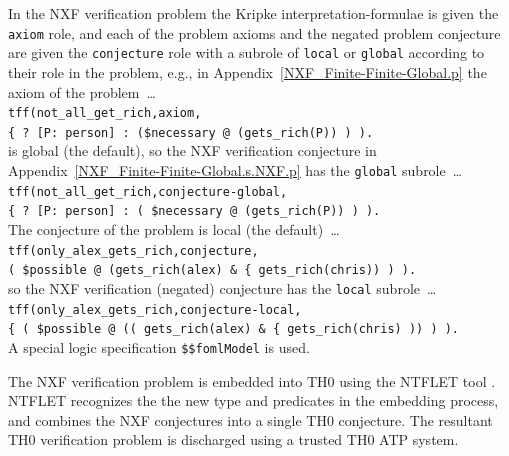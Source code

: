 \documentclass{easychair}
\newcommand{\smalltt}[1]{\small \texttt{#1}}
\begin{document}
In the NXF verification problem the Kripke interpretation-formulae is given the {\tt axiom} role,
and each of the problem axioms and the negated problem conjecture are given the {\tt conjecture} 
role with a subrole of {\tt local} or {\tt global} according to their role in the problem, e.g., 
in Appendix~\ref{NXF_Finite-Finite-Global.p} the axiom of the problem~\ldots \\
\hspace*{0.5cm}\smalltt{tff(not\_all\_get\_rich,axiom,} \\
\hspace*{0.8cm}\smalltt{\{{\raisebox{0.4ex}{\texttildelow}} ? [P: person] : ({\$necessary} @ (gets\_rich(P)) ) ).}\\
is global (the default), so the NXF verification conjecture in 
Appendix~\ref{NXF_Finite-Finite-Global.s.NXF.p} has the {\tt global} subrole~\ldots \\
\hspace*{0.5cm}\smalltt{tff(not\_all\_get\_rich,conjecture-global,} \\
\hspace*{0.8cm}\smalltt{\{{\raisebox{0.4ex}{\texttildelow}} ? [P: person] : ( {\$necessary} @ (gets\_rich(P)) ) ).} \\
The conjecture of the problem is local (the default)~\ldots \\
\hspace*{0.5cm}\smalltt{tff(only\_alex\_gets\_rich,conjecture,} \\
\hspace*{0.8cm}\smalltt{( {\$possible} @ (gets\_rich(alex) \& \{{\raisebox{0.4ex}{\texttildelow}} gets\_rich(chris)) ) ).} \\
so the NXF verification (negated) conjecture has the {\tt local} subrole~\ldots \\
\hspace*{0.5cm}\smalltt{tff(only\_alex\_gets\_rich,conjecture-local,} \\
\hspace*{0.8cm}\smalltt{\{{\raisebox{0.4ex}{\texttildelow}} ( {\$possible} @ (( gets\_rich(alex) \& \{{\raisebox{0.4ex}{\texttildelow}} gets\_rich(chris) )) ) ).} \\
A special logic specification {\tt \$\$fomlModel} is used.

The NXF verification problem is embedded into TH0 using the NTFLET tool \cite{Ste22,Ste22-LE}.
NTFLET recognizes the the new type and predicates in the embedding process, and combines
the NXF conjectures into a single TH0 conjecture.
The resultant TH0 verification problem is discharged using a trusted TH0 ATP system.
\end{document}
